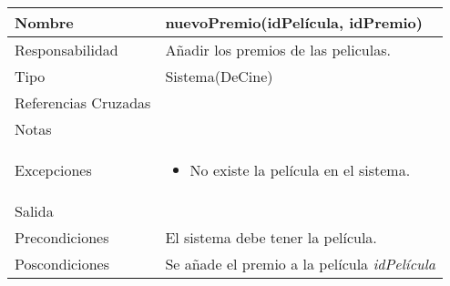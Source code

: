 \documentclass{article}
\begin{document}
\begin{table}[h]
\begin{tabular}{|l|l|l|l|l|l|}
\hline
\multicolumn{2}{|p{3cm}|}{Nombre} & \multicolumn{4}{p{10cm}|}{\textbf{nuevoPremio(idPelícula, idPremio)}}\\
\hline
\multicolumn{2}{|p{3cm}|}{Responsabilidad} & \multicolumn{4}{p{10cm}|}{Añadir los premios de las peliculas.} \\
\hline
\multicolumn{2}{|p{3cm}|}{Tipo} & \multicolumn{4}{p{10cm}|}{Sistema(DeCine)} \\
\hline
\multicolumn{2}{|p{3cm}|}{Referencias Cruzadas} & \multicolumn{4}{p{10cm}|}{} \\
\hline
\multicolumn{2}{|p{3cm}|}{Notas} & \multicolumn{4}{p{10cm}|}{} \\
\hline
\multicolumn{2}{|p{3cm}|}{Excepciones} & \multicolumn{4}{p{10cm}|}{\begin{itemize}
\item No existe la película en el sistema.
\end{itemize}} \\
\hline
\multicolumn{2}{|p{3cm}|}{Salida} & \multicolumn{4}{p{10cm}|}{} \\
\hline
\multicolumn{2}{|p{3cm}|}{Precondiciones} & \multicolumn{4}{p{10cm}|}{El sistema debe tener la película.} \\
\hline
\multicolumn{2}{|p{3cm}|}{Poscondiciones} & \multicolumn{4}{p{10cm}|}{Se añade el premio a la película \textit{idPelícula}} \\
\hline
\end{tabular}
\end{table}
\end{document}
